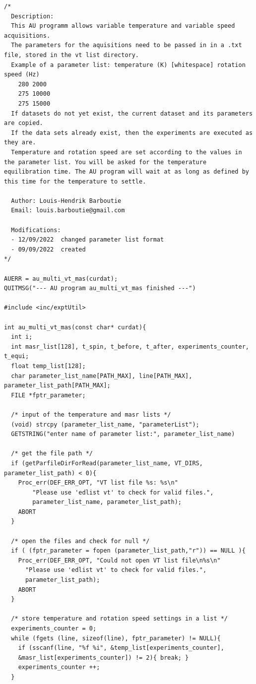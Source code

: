\documentclass[12pt]{article}
\begin{document}
\begin{verbatim}
/*
  Description:
  This AU programm allows variable temperature and variable speed acquisitions.
  The parameters for the aquisitions need to be passed in in a .txt file, stored in the vt list directory.
  Example of a parameter list: temperature (K) [whitespace] rotation speed (Hz)
    280 2000
    275 10000
    275 15000
  If datasets do not yet exist, the current dataset and its parameters are copied. 
  If the data sets already exist, then the experiments are executed as they are.
  Temperature and rotation speed are set according to the values in the parameter list. You will be asked for the temperature equilibration time. The AU program will wait at as long as defined by this time for the temperature to settle.

  Author: Louis-Hendrik Barboutie
  Email: louis.barboutie@gmail.com

  Modifications:
  - 12/09/2022  changed parameter list format
  - 09/09/2022  created
*/

AUERR = au_multi_vt_mas(curdat);
QUITMSG("--- AU program au_multi_vt_mas finished ---")

#include <inc/exptUtil>

int au_multi_vt_mas(const char* curdat){
  int i;
  int masr_list[128], t_spin, t_before, t_after, experiments_counter, t_equi;
  float temp_list[128];
  char parameter_list_name[PATH_MAX], line[PATH_MAX], parameter_list_path[PATH_MAX];
  FILE *fptr_parameter;
    
  /* input of the temperature and masr lists */
  (void) strcpy (parameter_list_name, "parameterList");
  GETSTRING("enter name of parameter list:", parameter_list_name)
  
  /* get the file path */
  if (getParfileDirForRead(parameter_list_name, VT_DIRS, parameter_list_path) < 0){
    Proc_err(DEF_ERR_OPT, "VT list file %s: %s\n"
		"Please use 'edlist vt' to check for valid files.",
		parameter_list_name, parameter_list_path);
    ABORT
  }

  /* open the files and check for null */
  if ( (fptr_parameter = fopen (parameter_list_path,"r")) == NULL ){
  	Proc_err(DEF_ERR_OPT, "Could not open VT list file\n%s\n"
	  "Please use 'edlist vt' to check for valid files.",
	  parameter_list_path);
   	ABORT
  }	
  	
  /* store temperature and rotation speed settings in a list */
  experiments_counter = 0;
  while (fgets (line, sizeof(line), fptr_parameter) != NULL){
	if (sscanf(line, "%f %i", &temp_list[experiments_counter],
	&masr_list[experiments_counter]) != 2){ break; }
	experiments_counter ++;
  }
        		

\end{verbatim}
\end{document}

